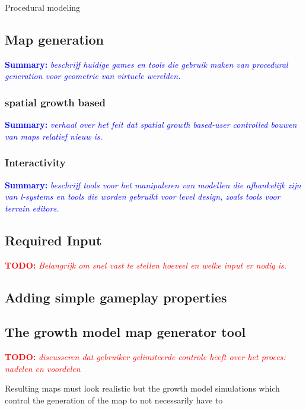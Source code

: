 \documentclass{article}
\newcommand{\todo}[1]{\textcolor{red}{\textbf{\newline TODO: }\it{#1} \newline}}
\newcommand{\inhoud}[1]{\textcolor{blue}{\textbf{\newline Summary: }\it{#1}}}
\begin{document}
Procedural modeling                        



\cite{citysurvey}




\subsection{Map generation}
\inhoud{beschrijf huidige games en tools die gebruik maken van procedural generation voor geometrie van virtuele werelden.}

\subsubsection{spatial growth based}
\inhoud{verhaal over het feit dat spatial growth based-user controlled bouwen van maps relatief nieuw is.}

\subsubsection{Interactivity}
\inhoud{beschrijf tools voor het manipuleren van modellen die afhankelijk zijn van l-systems en tools die worden 
	gebruikt voor level design, zoals tools voor terrain editors.}


\subsection{Required Input}
\todo{Belangrijk om snel vast te stellen hoeveel en welke input er nodig is.}



\subsection{Adding simple gameplay properties}

\subsection{The growth model map generator tool}
\todo{discusseren dat gebruiker gelimiteerde controle heeft over het proces: nadelen en voordelen}


Resulting maps must look realistic but the growth model simulations which control the generation of the map to not necessarily have to       
\end{document}
